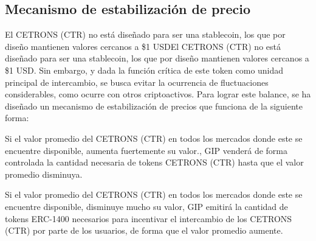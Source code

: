 \subsection{Mecanismo de estabilización de precio}
El CETRONS (CTR) no está diseñado para ser una stablecoin, los que por diseño mantienen valores cercanos a \$1 USDEl CETRONS (CTR) no está diseñado para ser una stablecoin, los que por diseño mantienen valores cercanos a \$1 USD. Sin embargo, y dada la función crítica de este token como unidad principal de intercambio, se busca evitar la ocurrencia de fluctuaciones considerables, como ocurre con otros criptoactivos. Para lograr este balance, se ha diseñado un mecanismo de estabilización de precios que funciona de la siguiente forma:

Si el valor promedio del CETRONS (CTR) en todos los mercados donde este se encuentre disponible, aumenta fuertemente su valor., GIP venderá de forma controlada la cantidad necesaria de tokens CETRONS (CTR) hasta que el valor promedio disminuya.

Si el valor promedio del CETRONS (CTR) en todos los mercados donde este se encuentre disponible, disminuye mucho su valor, GIP emitirá la cantidad de tokens ERC-1400 necesarios para incentivar el intercambio de los CETRONS (CTR) por parte de los usuarios, de forma que el valor promedio aumente.
